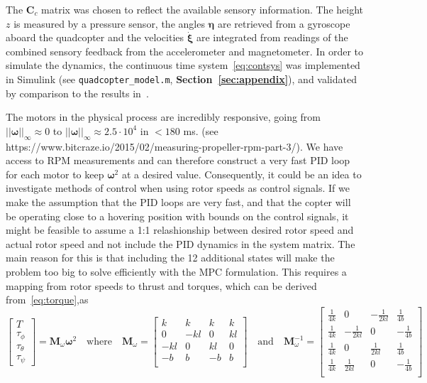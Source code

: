 \documentclass{article}
\begin{document}
The $\mathbf{C}_c$ matrix was chosen to reflect the available sensory information. The height $z$ is measured by a pressure sensor, the angles $\boldsymbol{\eta}$ are retrieved from a gyroscope aboard the quadcopter and the velocities $\dot{\boldsymbol{\xi}}$ are integrated from readings of the combined sensory feedback from the accelerometer and magnetometer. In order to simulate the dynamics, the continuous time system~\eqref{eq:contsys} was implemented in Simulink (see \texttt{quadcopter\_model.m}, \textbf{Section~\ref{sec:appendix}}), and validated by comparison to the results in~\cite{luukkonen2011modelling}.

The motors in the physical process are incredibly responsive, going from $||{\boldsymbol\omega}||_{\infty} \approx 0$ to $||{\boldsymbol\omega}||_{\infty} \approx 2.5\cdot 10^4$ in $< 180$ ms. (see https://www.bitcraze.io/2015/02/measuring-propeller-rpm-part-3/). We have access to RPM measurements and can therefore construct a very fast PID loop for each motor to keep $\boldsymbol\omega^2$ at a desired value. Consequently, it could be an idea to investigate methods of control when using rotor speeds as control signals. If we make the assumption that the PID loops are very fast, and that the copter will be operating close to a hovering position with bounds on the control signals, it might be feasible to assume a 1:1 relashionship between desired rotor speed and actual rotor speed and not include the PID dynamics in the system matrix. The main reason for this is that including the 12 additional states will make the problem too big to solve efficiently with the MPC formulation. This requires a mapping from rotor speeds to thrust and torques, which can be derived from~\eqref{eq:torque},as
\begin{equation}\label{eq:tomegamapping}
\begin{bmatrix}
T\\
\tau_{\phi}\\
\tau_{\theta}\\
\tau_{\psi}
\end{bmatrix}
=
\mathbf{M}_{\omega}\boldsymbol\omega^2
\quad\text{where}\quad
\mathbf{M}_{\omega} = 
\begin{bmatrix}
    k&    k&   k&   k\\
    0& -kl&   0& kl\\
 -kl&    0& kl&  0\\
   -b&    b&  -b&   b\\
\end{bmatrix}
\quad\text{and}\quad
\mathbf{M}^{-1}_{\omega} = 
\begin{bmatrix}
    \frac{1}{4k}& 0 & -\frac{1}{2kl} &  \frac{1}{4b}\\
    \frac{1}{4k}& -\frac{1}{2kl} & 0 & -\frac{1}{4b}\\
    \frac{1}{4k}& 0 &  \frac{1}{2kl} &  \frac{1}{4b}\\
    \frac{1}{4k}&  \frac{1}{2kl} & 0 & -\frac{1}{4b}\\
\end{bmatrix}
\end{equation}
\end{document}
